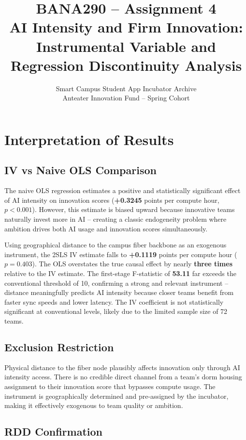 \documentclass[12pt]{article}
\title{\textbf{BANA290 -- Assignment 4} \\
       \large AI Intensity and Firm Innovation: \\
       Instrumental Variable and Regression Discontinuity Analysis}
\author{Smart Campus Student App Incubator Archive \\
        Anteater Innovation Fund -- Spring Cohort}
\date{}
\begin{document}
\maketitle

\section*{Interpretation of Results}

\subsection*{IV vs Naive OLS Comparison}

The naive OLS regression estimates a positive and statistically
significant effect of AI intensity on innovation scores
(\textbf{+0.3245} points per compute hour, $p < 0.001$). However,
this estimate is biased upward because innovative teams naturally
invest more in AI -- creating a classic endogeneity problem where
ambition drives both AI usage and innovation scores simultaneously.

Using geographical distance to the campus fiber backbone as an
exogenous instrument, the 2SLS IV estimate falls to
\textbf{+0.1119} points per compute hour ($p = 0.403$). The OLS
overstates the true causal effect by nearly \textbf{three times}
relative to the IV estimate. The first-stage F-statistic of
\textbf{53.11} far exceeds the conventional threshold of 10,
confirming a strong and relevant instrument -- distance
meaningfully predicts AI intensity because closer teams benefit
from faster sync speeds and lower latency. The IV coefficient
is not statistically significant at conventional levels, likely
due to the limited sample size of 72 teams.

\subsection*{Exclusion Restriction}

Physical distance to the fiber node plausibly affects innovation
only through AI intensity access. There is no credible direct
channel from a team's dorm housing assignment to their innovation
score that bypasses compute usage. The instrument is geographically
determined and pre-assigned by the incubator, making it
effectively exogenous to team quality or ambition.

\subsection*{RDD Confirmation}
\end{document}
